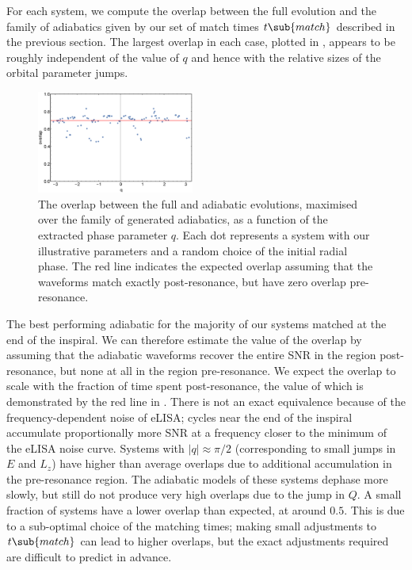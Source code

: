 For each system, we compute the overlap between the full evolution and the family of adiabatics given by our set of match times $t\sub{match}$ described in the previous section. The largest overlap in each case, plotted in , appears to be roughly independent of the value of $q$ and hence with the relative sizes of the orbital parameter jumps.
\begin{figure}
\centering
\includegraphics[width=0.46\textwidth]{overlap_vs_q}
\caption{\label{fig:overlap-vs-q}The overlap between the full and adiabatic evolutions, maximised over the family of generated adiabatics, as a function of the extracted phase parameter $q$. Each dot represents a system with our illustrative parameters and a random choice of the initial radial phase. The red line indicates the expected overlap assuming that the waveforms match exactly post-resonance, but have zero overlap pre-resonance.}
\end{figure}
The best performing adiabatic for the majority of our systems matched at the end of the inspiral. We can therefore estimate the value of the overlap by assuming that the adiabatic waveforms recover the entire SNR in the region post-resonance, but none at all in the region pre-resonance. We expect the overlap to scale with the fraction of time spent post-resonance, the value of which is demonstrated by the red line in . There is not an exact equivalence because of the frequency-dependent noise of eLISA; cycles near the end of the inspiral accumulate proportionally more SNR at a frequency closer to the minimum of the eLISA noise curve.
Systems with $|q| \approx \pi/2$ (corresponding to small jumps in $E$ and $L_z$) have higher than average overlaps due to additional accumulation in the pre-resonance region. The adiabatic models of these systems dephase more slowly, but still do not produce very high overlaps due to the jump in $Q$. A small fraction of systems have a lower overlap than expected, at around $0.5$. This is due to a sub-optimal choice of the matching times; making small adjustments to $t\sub{match}$ can lead to higher overlaps, but the exact adjustments required are difficult to predict in advance.


